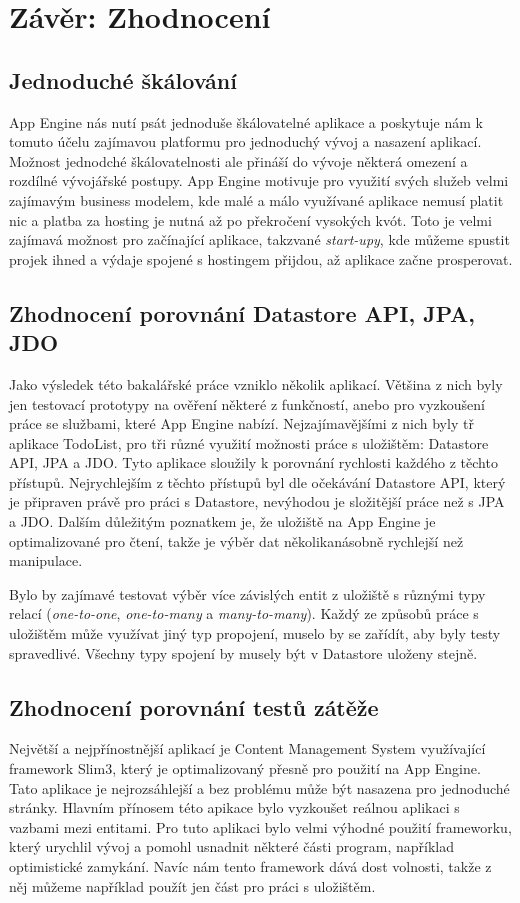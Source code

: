 \chapter{Závěr: Zhodnocení}

\section{Jednoduché škálování}
App Engine nás nutí psát jednoduše škálovatelné aplikace a poskytuje nám k tomuto účelu zajímavou platformu pro jednoduchý vývoj a nasazení aplikací. Možnost jednodché škálovatelnosti ale přináší do vývoje některá omezení a rozdílné vývojářské postupy. App Engine motivuje pro využití svých služeb velmi zajímavým business modelem, kde malé a málo využívané aplikace nemusí platit nic a platba za hosting je nutná až po překročení vysokých kvót. Toto je velmi zajímavá možnost pro začínající aplikace, takzvané \emph{start-upy}, kde můžeme spustit projek ihned a výdaje spojené s hostingem přijdou, až aplikace začne prosperovat.

\section{Zhodnocení porovnání Datastore API, JPA, JDO}
Jako výsledek této bakalářské práce vzniklo několik aplikací. Většina z nich byly jen testovací prototypy na ověření některé z funkčností, anebo pro vyzkoušení práce se službami, které App Engine nabízí. Nejzajímavějšími z nich byly tř aplikace TodoList, pro tři různé využití možnosti práce s uložištěm: Datastore API, JPA a JDO. Tyto aplikace sloužily k porovnání rychlosti každého z těchto přístupů. Nejrychlejším z těchto přístupů byl dle očekávání Datastore API, který je připraven právě pro práci s Datastore, nevýhodou je složitější práce než s JPA a JDO. Dalším důležitým poznatkem je, že uložiště na App Engine je optimalizované pro čtení, takže je výběr dat několikanásobně rychlejší než manipulace.

Bylo by zajímavé testovat výběr více závislých entit z uložiště s různými typy relací (\emph{one-to-one}, \emph{one-to-many} a \emph{many-to-many}). Každý ze způsobů práce s uložištěm může využívat jiný typ propojení, muselo by se zařídít, aby byly testy spravedlivé. Všechny typy spojení by musely být v Datastore uloženy stejně.

\section{Zhodnocení porovnání testů zátěže}
Největší a nejpřínostnější aplikací je Content Management System využívající framework Slim3, který je optimalizovaný přesně pro použití na App Engine. Tato aplikace je nejrozsáhlejší a bez problému může být nasazena pro jednoduché stránky. Hlavním přínosem této apikace bylo vyzkoušet reálnou aplikaci s vazbami mezi entitami. Pro tuto aplikaci bylo velmi výhodné použití frameworku, který urychlil vývoj a pomohl usnadnit některé části program, například optimistické zamykání. Navíc nám tento framework dává dost volnosti, takže z něj můžeme například použít jen část pro práci s uložištěm. 

